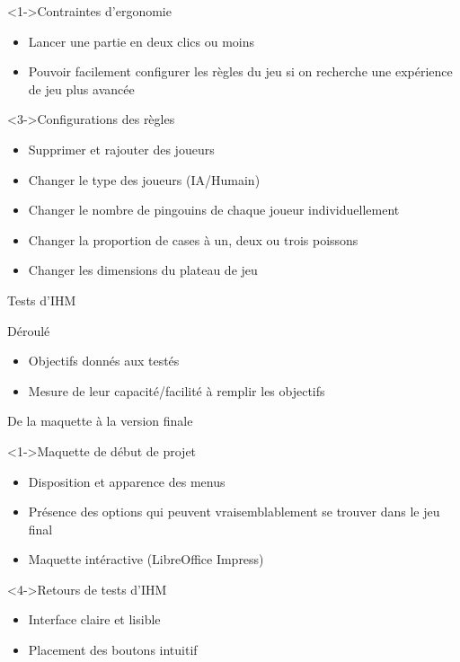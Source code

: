 \documentclass{beamer}
\begin{document}
\begin{frame}{}
  \begin{block}<1->{Contraintes d'ergonomie}
	\begin{itemize}
	\item <1-> Lancer une partie en deux clics ou moins
	\item <2-> Pouvoir facilement configurer les règles du jeu si on recherche une expérience de jeu plus avancée
  	\end{itemize}
  \end{block}
  \begin{block}<3->{Configurations des règles}
	\begin{itemize}
	\item <3-> Supprimer et rajouter des joueurs
	\item <4-> Changer le type des joueurs (IA/Humain)
	\item <5-> Changer le nombre de pingouins de chaque joueur individuellement
	\item <6-> Changer la proportion de cases à un, deux ou trois poissons
	\item <7-> Changer les dimensions du plateau de jeu
  	\end{itemize}
  \end{block}
\end{frame}

\begin{frame}{Tests d'IHM}
  \begin{block}{Déroulé}
	\begin{itemize}
	\item <1-> Objectifs donnés aux testés
	\item <2-> Mesure de leur capacité/facilité à remplir les objectifs
	\end{itemize}
  \end{block}
\end{frame}

\begin{frame}{De la maquette à la version finale}
  \begin{block}<1->{Maquette de début de projet}
	\begin{itemize}
	\item <1-> Disposition et apparence des menus
	\item <2-> Présence des options qui peuvent vraisemblablement se trouver dans le jeu final
	\item <3-> Maquette intéractive (LibreOffice Impress)
  	\end{itemize}
  \end{block}
  \begin{example}<4->{Retours de tests d'IHM}
    \begin{itemize}
	\item <4-> Interface claire et lisible
	\item <5-> Placement des boutons intuitif
	\end{itemize}
  \end{example}
\end{frame}
\end{document}
